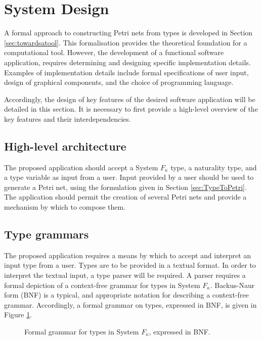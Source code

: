 \documentclass[../Dissertation.tex]{subfiles}
\begin{document}
\section{System Design}
A formal approach to constructing Petri nets from types is developed in Section \ref{sec:towardsatool}. This formalisation provides the theoretical foundation for a computational tool. However, the development of a functional software application, requires determining and designing specific implementation details. Examples of implementation details include formal specifications of user input, design of graphical components, and the choice of programming language. 
\par
Accordingly, the design of key features of the desired software application will  be detailed in this section. It is necessary to first provide a high-level overview of the key features and their interdependencies.

\subsection{High-level architecture}
The proposed application should accept a System $F_\kappa$ type, a naturality type, and a type variable as input from a user. Input provided by a user should be used to generate a Petri net, using the formulation given in Section \ref{sec:TypeToPetri}. The application should permit the creation of several Petri nets and provide a mechanism by which to compose them. 

\subsection{Type grammars}
The proposed application requires a means by which to accept and interpret an input type from a user. Types are to be provided in a textual format. In order to interpret the textual input, a type parser will be required. A parser requires a formal depiction of a context-free grammar for types in System $F_\kappa$. Backus-Naur form (BNF) is a typical, and appropriate notation for describing a context-free grammar. Accordingly, a formal grammar on types, expressed in BNF, is given in Figure \ref{fig:typegrammar}.

\begin{figure}[H]

\caption{Formal grammar for types in System $F_\kappa$, expressed in BNF.}
\label{fig:typegrammar}
\end{figure}
\end{document}
